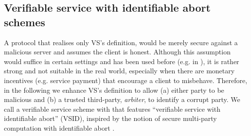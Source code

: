 

\subsection{Verifiable service with identifiable abort schemes}\label{subsec:VSID}


A protocol that realises only VS's definition, would be merely secure against a malicious server and  assumes the client is honest.  Although this  assumption would suffice in certain settings and has been used before (e.g. in \cite{}), it is rather strong and not suitable in the real world, especially when there are monetary incentives (e.g. service payment)  that encourage a client to misbehave. Therefore, in the following we enhance VS's definition to allow  (a) either party to be malicious and (b) a trusted third-party, \emph{arbiter}, to identify a corrupt party. We call a verifiable service scheme with that features ``verifiable service with identifiable abort'' (VSID), inspired by the notion of secure multi-party computation with identifiable abort \cite{DBLP:conf/crypto/IshaiOZ14}. 






\



